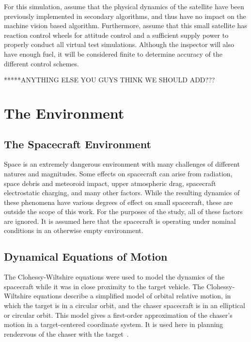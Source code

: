 \documentclass[journal, 10pt]{IEEEtran}
\begin{document}
For this simulation, assume that the physical dynamics of the satellite have been previously implemented in secondary algorithms, and thus have no impact on the machine vision based algorithm. Furthermore, assume that this small satellite has reaction control wheels for attitude control and a sufficient supply power to properly conduct all virtual test simulations.  Although the inspector will also have enough fuel, it will be considered finite to determine accuracy of the different control schemes.

*****ANYTHING ELSE YOU GUYS THINK WE SHOULD ADD???

\section{The Environment}
\subsection{The Spacecraft Environment}
Space is an extremely dangerous environment with many challenges of different natures and magnitudes. Some effects on spacecraft can arise from radiation, space debris and meteoroid impact, upper atmospheric drag, spacecraft electrostatic charging, and many other factors. While the resulting dynamics of these phenomena have various degrees of effect on small spacecraft, these are outside the scope of this work. For the purposes of the study, all of these factors are ignored. It is assumed here that the spacecraft is operating under nominal conditions in an otherwise empty environment.

\subsection{Dynamical Equations of Motion} \label{cweqs}
The Clohessy-Wiltshire equations were used to model the dynamics of the spacecraft while it was in close proximity to the target vehicle. The Clohessy-Wiltshire equations describe a simplified model of orbital relative motion, in which the target is in a circular orbit, and the chaser spacecraft is in an elliptical or circular orbit. This model gives a first-order approximation of the chaser's motion in a target-centered coordinate system. It is used here in planning rendezvous of the chaser with the target~\cite{cw_eqs}.
\end{document}
